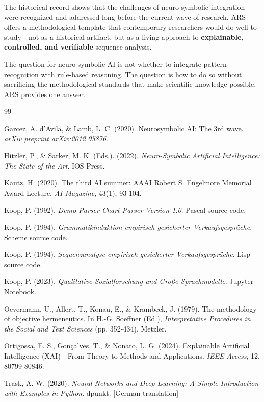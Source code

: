 \documentclass[12pt,a4paper]{article}
\begin{document}
The historical record shows that the challenges of neuro-symbolic integration 
were recognized and addressed long before the current wave of research. ARS 
offers a methodological template that contemporary researchers would do well 
to study—not as a historical artifact, but as a living approach to 
\textbf{explainable, controlled, and verifiable} sequence analysis.

The question for neuro-symbolic AI is not whether to integrate pattern 
recognition with rule-based reasoning. The question is how to do so without 
sacrificing the methodological standards that make scientific knowledge 
possible. ARS provides one answer.

\newpage
\begin{thebibliography}{99}

Garcez, A. d'Avila, \& Lamb, L. C. (2020). Neurosymbolic AI: The 3rd wave. 
\textit{arXiv preprint arXiv:2012.05876}.

Hitzler, P., \& Sarker, M. K. (Eds.). (2022). \textit{Neuro-Symbolic Artificial 
Intelligence: The State of the Art}. IOS Press.

Kautz, H. (2020). The third AI summer: AAAI Robert S. Engelmore Memorial Award 
Lecture. \textit{AI Magazine}, 43(1), 93-104.

Koop, P. (1992). \textit{Demo-Parser Chart-Parser Version 1.0}. Pascal source code.

Koop, P. (1994). \textit{Grammatikinduktion empirisch gesicherter 
Verkaufsgespräche}. Scheme source code.

Koop, P. (1994). \textit{Sequenzanalyse empirisch gesicherter 
Verkaufsgespräche}. Lisp source code.

Koop, P. (2023). \textit{Qualitative Sozialforschung und Große Sprachmodelle}. 
Jupyter Notebook.

Oevermann, U., Allert, T., Konau, E., \& Krambeck, J. (1979). The methodology 
of objective hermeneutics. In H.-G. Soeffner (Ed.), \textit{Interpretative 
Procedures in the Social and Text Sciences} (pp. 352-434). Metzler.

Ortigossa, E. S., Gonçalves, T., \& Nonato, L. G. (2024). Explainable Artificial 
Intelligence (XAI)—From Theory to Methods and Applications. \textit{IEEE Access}, 
12, 80799-80846.

Trask, A. W. (2020). \textit{Neural Networks and Deep Learning: A Simple 
Introduction with Examples in Python}. dpunkt. [German translation]

\end{thebibliography}
\end{document}
